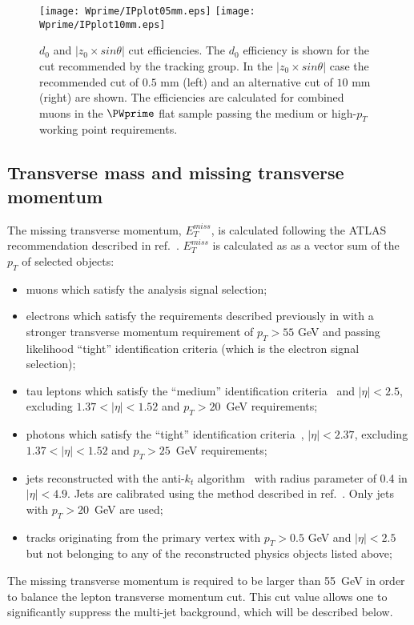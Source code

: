 \begin{figure}[]
  \centering
  \texttt{[image: Wprime/IPplot05mm.eps]}
  \texttt{[image: Wprime/IPplot10mm.eps]}
  \caption{$d_{0}$ and $|z_0 \times sin \theta|$ cut efficiencies. The $d_{0}$ efficiency is shown for the cut recommended by the tracking group. In the $|z_0 \times sin \theta|$ case the recommended cut of $0.5$ mm (left) and an alternative cut of $10$ mm (right) are shown. The efficiencies are calculated for combined muons in the
$\PWprime$ flat sample passing the medium or high-$p_T$ working point requirements.}
  \label{fig:Muon_LepVtxEff}
\end{figure}


\subsection{Transverse mass and missing transverse momentum}
\label{subsec:etmiss}
The missing transverse momentum, $E_T^{miss}$, is calculated following the ATLAS recommendation described in ref.~\cite{met2015_1,met2015_2}.
$E_T^{miss}$ is calculated as as a vector sum of the $p_T$ of selected objects:
\begin{itemize}
 \item muons which satisfy the analysis signal selection;
 \item electrons which satisfy the requirements described previously in
  with a stronger transverse momentum requirement of $p_T > 55$ GeV
 and passing likelihood ``tight'' identification criteria (which is the electron signal selection);
 \item tau leptons which satisfy the ``medium'' identification criteria~\cite{tau_id_8TeV} and $|\eta| < 2.5$, excluding  $1.37 < |\eta| < 1.52$ and $p_T > 20$~GeV requirements;
 \item photons which satisfy the ``tight'' identification criteria~\cite{photon_id_2011}, $|\eta| < 2.37$, excluding  $1.37 < |\eta| < 1.52$ and $p_T > 25$~GeV requirements;
 \item jets reconstructed with the anti-$k_t$ algorithm~\cite{jet_anti_kt} with radius parameter of 0.4 in $|\eta| < 4.9$.
 Jets are calibrated using the method described in ref.~\cite{jet_calib_syst_13TeV}.
 Only jets with $p_T > 20$~GeV are used;
 \item tracks originating from the primary vertex with $p_T > 0.5$ GeV and $|\eta| < 2.5$ but not belonging to any of the reconstructed physics objects listed above;
\end{itemize}
The missing transverse momentum is required to be larger than 55~GeV in order 
to balance the lepton transverse momentum cut.
This cut value allows one to significantly suppress 
the multi-jet background, which will be described below.

